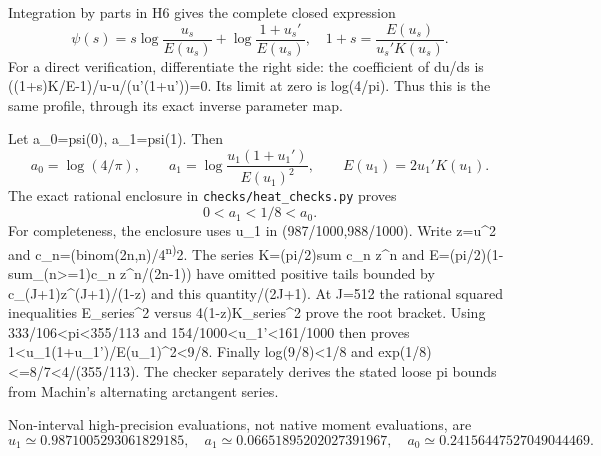 Integration by parts in H6 gives the complete closed expression \[
 \boxed{\psi(s)=s\log\frac{u_s}{E(u_s)}+
                   \log\frac{1+u_s'}{E(u_s)},\quad
       1+s=\frac{E(u_s)}{u_s'K(u_s)}.}
 \tag{H7}
\] For a direct verification, differentiate the right side: the coefficient of du/ds is ((1+s)K/E-1)/u-u/(u'(1+u'))=0. Its limit at zero is log(4/pi). Thus this is the same profile, through its exact inverse parameter map.

Let a\_0=psi(0), a\_1=psi(1). Then \[
 a_0=\log(4/\pi),\qquad
 a_1=\log\frac{u_1(1+u_1')}{E(u_1)^2},\qquad
 E(u_1)=2u_1'K(u_1).
 \tag{H8}
\] The exact rational enclosure in \nolinkurl{checks/heat_checks.py} proves \[
 \boxed{0<a_1<1/8<a_0.}\tag{H9}
\] For completeness, the enclosure uses u\_1 in (987/1000,988/1000). Write z=u\^{}2 and c\_n=(binom(2n,n)/4\textsuperscript{n)}2. The series K=(pi/2)sum c\_n z\^{}n and E=(pi/2)(1-sum\_(n\textgreater=1)c\_n z\^{}n/(2n-1)) have omitted positive tails bounded by c\_(J+1)z\^{}(J+1)/(1-z) and this quantity/(2J+1). At J=512 the rational squared inequalities E\_series\^{}2 versus 4(1-z)K\_series\^{}2 prove the root bracket. Using 333/106\textless pi\textless355/113 and 154/1000\textless u\_1'\textless161/1000 then proves 1\textless u\_1(1+u\_1')/E(u\_1)\^{}2\textless9/8. Finally log(9/8)\textless1/8 and exp(1/8)\textless=8/7\textless4/(355/113). The checker separately derives the stated loose pi bounds from Machin's alternating arctangent series.

Non-interval high-precision evaluations, not native moment evaluations, are \[
 u_1\simeq0.9871005293061829185,\quad
 a_1\simeq0.06651895202027391967,\quad
 a_0\simeq0.24156447527049044469.
\]
